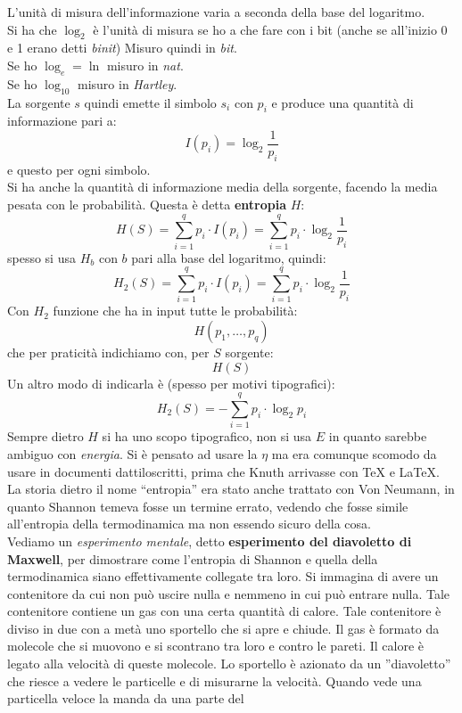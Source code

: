 \documentclass[a4paper,12pt, oneside]{book}
\begin{document}
L'unità di misura dell'informazione varia a seconda della base del logaritmo.\\
Si ha che $\log_2$ è l'unità di misura se ho a che fare con i bit (anche se
all'inizio 0 e 1 erano detti \textit{binit}) Misuro quindi in \textit{bit}. \\
Se ho $\log_e=\ln$ misuro in \textit{nat}.\\
Se ho $\log_{10}$ misuro in \textit{Hartley}.\\
La sorgente $s$ quindi emette il simbolo $s_i$ con $p_i$ e produce una quantità
di informazione pari a:
\[I(p_i)=\log_2\frac{1}{p_i}\]
e questo per ogni simbolo.\\
Si ha anche la quantità di informazione media della sorgente, facendo la media
pesata con le probabilità. Questa è detta \textbf{entropia} $H$:
\[H(S)=\sum_{i=1}^qp_i\cdot I(p_i)=\sum_{i=1}^qp_i\cdot \log_2\frac{1}{p_i}\]
spesso si usa $H_b$ con $b$ pari alla base del logaritmo, quindi:
\[H_2(S)=\sum_{i=1}^qp_i\cdot I(p_i)=\sum_{i=1}^qp_i\cdot \log_2\frac{1}{p_i}\]
Con $H_2$ funzione che ha in input tutte le probabilità:
\[H(p_1,\ldots,p_q)\]
che per praticità indichiamo con, per $S$ sorgente:
\[H(S)\]
Un altro modo di indicarla è (spesso per motivi tipografici):
\[H_2(S)=-\sum_{i=1}^qp_i\cdot \log_2{p_i}\]
Sempre dietro $H$ si ha uno scopo tipografico, non si usa $E$ in quanto sarebbe
ambiguo con \textit{energia}. Si è pensato ad usare la $\eta$ ma era comunque
scomodo da usare in documenti dattiloscritti, prima che Knuth arrivasse con \TeX
e \LaTeX.\\
La storia dietro il nome ``entropia'' era stato anche trattato con Von Neumann,
in quanto Shannon temeva fosse un termine errato, vedendo che fosse simile
all'entropia della termodinamica ma non essendo sicuro della cosa.\\
Vediamo un \textit{esperimento mentale}, detto \textbf{esperimento del
  diavoletto di Maxwell}, per dimostrare come l'entropia di Shannon e quella
della termodinamica siano effettivamente collegate tra loro. Si immagina di
avere un contenitore da cui non può uscire nulla e nemmeno in cui può entrare
nulla. Tale contenitore contiene un gas con una certa quantità di calore. Tale
contenitore è diviso in due con a metà uno sportello che si apre e chiude. Il
gas è formato da molecole che si muovono e si scontrano tra loro e contro le
pareti. Il calore è legato alla velocità di queste molecole. Lo sportello è
azionato da un ''diavoletto'' che riesce a vedere le particelle e di misurarne
la velocità. Quando vede una particella veloce la manda da una parte del
\end{document}

